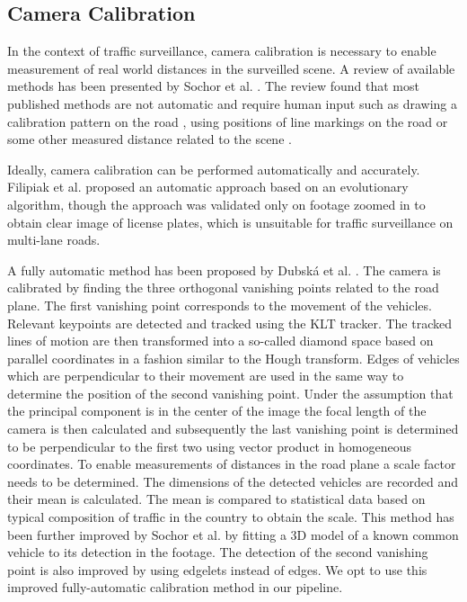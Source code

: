 \documentclass[twocolumn]{svjour3}          \smartqed  \usepackage{graphicx}
\begin{document}
\subsection{Camera Calibration}

In the context of traffic surveillance, camera calibration is necessary to enable measurement of real world distances in the surveilled scene. A review of available methods has been presented by Sochor et al. \cite{brnocompspeed}. The review found that most published methods are not automatic and require human input such as drawing a calibration pattern on the road \cite{pattern}, using positions of line markings on the road \cite{cathey,lan,maduro} or some other measured distance related to the scene \cite{schoepflin,you}.

Ideally, camera calibration can be performed automatically and accurately. Filipiak et al. \cite{filipiak} proposed an automatic approach based on an evolutionary algorithm, though the approach was validated only on footage zoomed in to obtain clear image of license plates, which is unsuitable for traffic surveillance on multi-lane roads.  

A fully automatic method has been proposed by Dubsk\'{a} et al. \cite{dubska2014}. The camera is calibrated by finding the three orthogonal vanishing points related to the road plane. The first vanishing point corresponds to the movement of the vehicles. Relevant keypoints are detected and tracked using the KLT tracker. The tracked lines of motion are then transformed into a so-called diamond space based on parallel coordinates in a fashion similar to the Hough transform. Edges of vehicles which are perpendicular to their movement are used in the same way to determine the position of the second vanishing point. Under the assumption that the principal component is in the center of the image the focal length of the camera is then calculated and subsequently the last vanishing point is determined to be perpendicular to the first two using vector product in homogeneous coordinates. To enable measurements of distances in the road plane a scale factor needs to be determined. The dimensions of the detected vehicles are recorded and their mean is calculated. The mean is compared to statistical data based on typical composition of traffic in the country to obtain the scale. This method has been further improved by Sochor et al. \cite{sochor2017} by fitting a 3D model of a known common vehicle to its detection in the footage. The detection of the second vanishing point is also improved by using edgelets instead of edges. We opt to use this improved fully-automatic calibration method in our pipeline.
\end{document}
